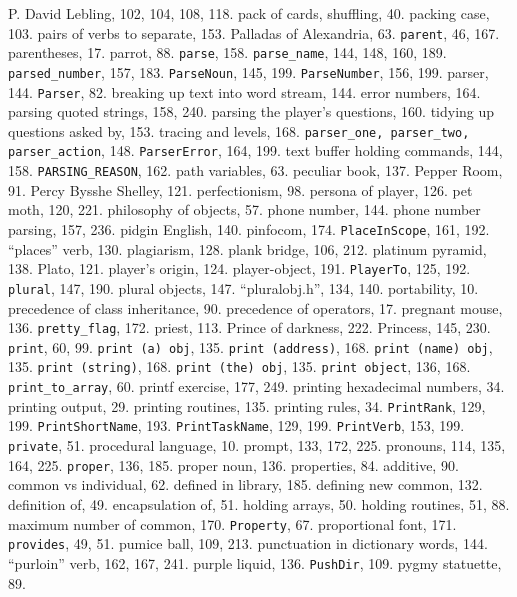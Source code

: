 P. David Lebling, 102, 104, 108, 118.
pack of cards, shuffling, 40.
packing case, 103.
pairs of verbs to separate, 153.
Palladas of Alexandria, 63.
{{\tt parent}}, 46, 167.
parentheses, 17.
parrot, 88.
{{\tt parse}}, 158.
{{\tt parse\_name}}, 144, 148, 160, 189.
{{\tt parsed\_number}}, 157, 183.
{{\tt ParseNoun}}, 145, 199.
{{\tt ParseNumber}}, 156, 199.
parser, 144.
{{\tt Parser}}, 82.
\quad  breaking up text into word stream, 144.
\quad  error numbers, 164.
\quad  parsing quoted strings, 158, 240.
\quad  parsing the player's questions, 160.
\quad  tidying up questions asked by, 153.
\quad  tracing and levels, 168.
{{\tt parser\_one, parser\_two, parser\_action}}, 148.
{{\tt ParserError}}, 164, 199.
\quad  text buffer holding commands, 144, 158.
{{\tt PARSING\_REASON}}, 162.
path variables, 63.
peculiar book, 137.
Pepper Room, 91.
Percy Bysshe Shelley, 121.
perfectionism, 98.
persona of player, 126.
pet moth, 120, 221.
philosophy of objects, 57.
phone number, 144.
phone number parsing, 157, 236.
pidgin English, 140.
pinfocom, 174.
{{\tt PlaceInScope}}, 161, 192.
``places'' verb, 130.
plagiarism, 128.
plank bridge, 106, 212.
platinum pyramid, 138.
Plato, 121.
player's origin, 124.
player-object, 191.
{{\tt PlayerTo}}, 125, 192.
{{\tt plural}}, 147, 190.
plural objects, 147.
``pluralobj.h'', 134, 140.
portability, 10.
precedence of class inheritance, 90.
precedence of operators, 17.
pregnant mouse, 136.
{{\tt pretty\_flag}}, 172.
priest, 113.
Prince of darkness, 222.
Princess, 145, 230.
{{\tt print}}, 60, 99.
{{\tt print (a) obj}}, 135.
{{\tt print (address)}}, 168.
{{\tt print (name) obj}}, 135.
{{\tt print (string)}}, 168.
{{\tt print (the) obj}}, 135.
{{\tt print object}}, 136, 168.
{{\tt print\_to\_array}}, 60.
printf exercise, 177, 249.
printing hexadecimal numbers, 34.
printing output, 29.
printing routines, 135.
printing rules, 34.
{{\tt PrintRank}}, 129, 199.
{{\tt PrintShortName}}, 193.
{{\tt PrintTaskName}}, 129, 199.
{{\tt PrintVerb}}, 153, 199.
{{\tt private}}, 51.
procedural language, 10.
prompt, 133, 172, 225.
pronouns, 114, 135, 164, 225.
{{\tt proper}}, 136, 185.
proper noun, 136.
properties, 84.
\quad  additive, 90.
\quad  common vs individual, 62.
\quad  defined in library, 185.
\quad  defining new common, 132.
\quad  definition of, 49.
\quad  encapsulation of, 51.
\quad  holding arrays, 50.
\quad  holding routines, 51, 88.
\quad  maximum number of common, 170.
{{\tt Property}}, 67.
proportional font, 171.
{{\tt provides}}, 49, 51.
pumice ball, 109, 213.
punctuation in dictionary words, 144.
``purloin'' verb, 162, 167, 241.
purple liquid, 136.
{{\tt PushDir}}, 109.
pygmy statuette, 89.

